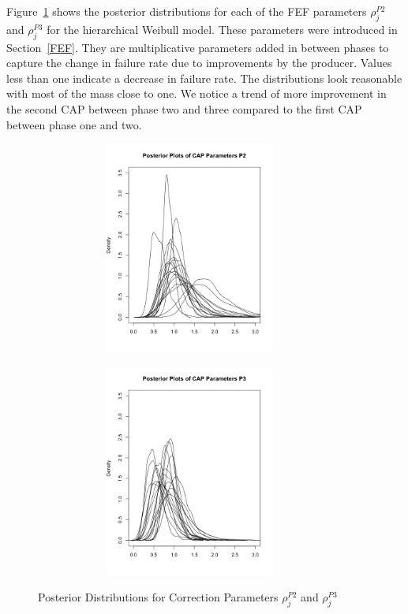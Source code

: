 \documentclass[12pt]{article}
\begin{document}
Figure~\ref{fig:CAP} shows the posterior distributions for each of the FEF parameters $\rho_{j}^{P2}$ and $\rho_{j}^{P3}$ for the hierarchical Weibull model.  These parameters were introduced in Section~\ref{FEF}.  They are multiplicative parameters added in between phases to capture the change in failure rate due to improvements by the producer.  Values less than one indicate a decrease in failure rate.  The distributions look reasonable with most of the mass close to one.  We notice a trend of more improvement in the second CAP between phase two and three compared to the first CAP between phase one and two.

\begin{figure}[ht]
\centering
\begin{subfigure}{.5\textwidth}
  \centering
      \includegraphics[width=8cm, height=7cm]{CAP2}
\end{subfigure}%
\begin{subfigure}{.5\textwidth}
  \center
  	\includegraphics[width=8cm, height=7cm]{CAP3}
\end{subfigure}
\caption{Posterior Distributions for Correction Parameters $\rho_{j}^{P2}$ and $\rho_{j}^{P3}$}
\label{fig:CAP}
\end{figure}
\end{document}
